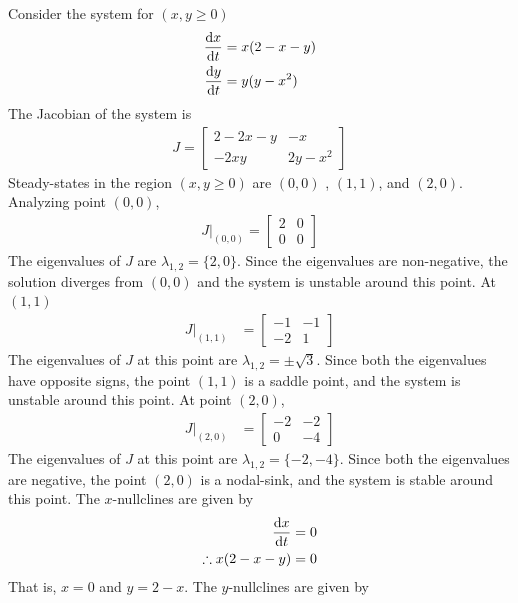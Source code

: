 \documentclass[12pt,1in]{article}
\newenvironment{Example}[2][Example]{\begin{trivlist}
		\item[\hskip \labelsep {\bfseries #1}\hskip \labelsep {\bfseries #2.}]}{\end{trivlist}}
\begin{document}
\begin{Example}{2}
	\cite[p.~488]{diff_eq}
	Consider the system for $(x,y \geq 0)$
	\begin{align*}
	\derivative{x}{t} &= x(2 - x - y)\\
	\derivative{y}{t} &= y(y - x^2)
	\end{align*}
	The Jacobian of the system is
	\begin{align*}
	J = \begin{bmatrix}
	2 -2x  -y & -x \\
	-2xy & 2y - x^2 
	\end{bmatrix}
	\end{align*}
	Steady-states in the region $(x,y \geq 0)$ are $(0,0)$ , $(1,1)$, and $(2,0)$. Analyzing point $(0,0)$,
	\begin{align*}
	J|_{(0,0)} = \begin{bmatrix}
	2 & 0 \\
	0 & 0
	\end{bmatrix}
	\end{align*}
	The eigenvalues of $J$ are $\lambda_{1,2} = \{2, 0\}$. Since the eigenvalues are non-negative, the solution diverges from $(0,0)$ and the system is unstable around this point. 
	At $(1,1)$
	\begin{align*}
	J|_{(1,1)} &= \begin{bmatrix}
	-1 & -1 \\
	-2 & 1
	\end{bmatrix}
	\end{align*}
	The eigenvalues of $J$ at this point are $\lambda_{1,2} = \pm \sqrt{3}$. Since both the eigenvalues have opposite signs, the point $(1,1)$ is a saddle point, and the system is unstable around this point. At point $(2,0)$,
	\begin{align*} J|_{(2,0)} &=
	\begin{bmatrix}
	-2 & -2 \\
	0 & - 4
	\end{bmatrix}
	\end{align*} 
	The eigenvalues of $J$ at this point are $\lambda_{1,2} = \{-2,-4\}$. Since both the eigenvalues are negative, the point $(2,0)$ is a nodal-sink, and the system is stable around this point. The $x$-nullclines are given by 
	\begin{align*}
	\derivative{x}{t} &= 0 \\
	\therefore x(2 - x - y) &= 0
	\end{align*}
	That is, $x = 0$ and $y = 2 - x$. The $y$-nullclines are given by 
	\begin{align*}

\end{align*}
\end{Example}
\end{document}
